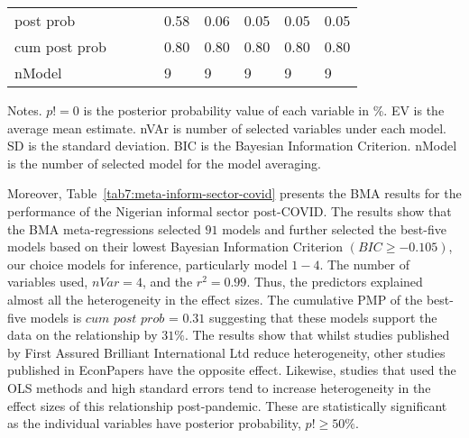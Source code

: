 \documentclass[12pt, english]{article}
\begin{document}
\begin{table}[H]
{\begin{tabular}{@{}lllllllll@{}}
                post prob                   &        &         &        & 0.58    & 0.06    & 0.05    & 0.05    & 0.05    \\
                cum post prob               &        &         &        & 0.80    & 0.80    & 0.80    & 0.80    & 0.80    \\
                nModel                      &        &         &        & 9       & 9       & 9       & 9       & 9       \\ \bottomrule
            \end{tabular}%
        }
        \begin{minipage}{18cm}
            \vspace{0.1cm}
            \small Notes. $p!=0$ is the posterior probability value of each variable in \%. EV is the average mean estimate. nVAr is number of selected variables under each model. SD is the standard deviation. BIC is the Bayesian Information Criterion. nModel is the number of selected model for the model averaging.
        \end{minipage}
    \end{table}

    Moreover, Table~\ref{tab7:meta-inform-sector-covid} presents the BMA results for the performance of the Nigerian informal sector post-COVID. The results show that the BMA meta-regressions selected $91$ models and further selected the best-five models based on their lowest Bayesian Information Criterion $(BIC \geq -0.105)$, our choice models for inference, particularly model $1-4$. The number of variables used, $nVar = 4$, and the $r^2 = 0.99$. Thus, the predictors explained almost all the heterogeneity in the effect sizes. The cumulative PMP of the best-five models is $cum$ $post$ $prob$ = $0.31$ suggesting that these models support the data on the relationship by $31\%$. The results show that whilst studies published by First Assured Brilliant International Ltd reduce heterogeneity, other studies published in EconPapers have the opposite effect. Likewise, studies that used the OLS methods and high standard errors tend to increase heterogeneity in the effect sizes of this relationship post-pandemic. These are statistically significant as the individual variables have posterior probability, $p! \geq 50\%$.
\end{document}
